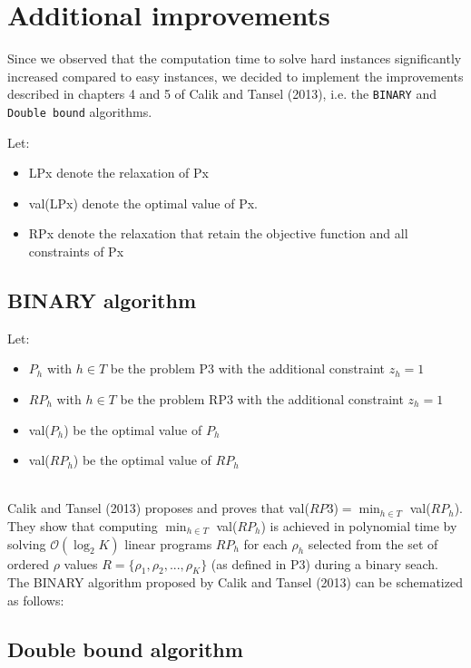 \chapter{Additional improvements}

Since we observed that the computation time to solve hard instances significantly increased compared to easy instances, we decided to implement the improvements described in chapters 4 and 5 of Calik and Tansel (2013), i.e. the \verb+BINARY+ and \verb+Double bound+ algorithms.

Let: 
\begin{itemize}
	\item LPx denote the relaxation of Px
	\item val(LPx) denote the optimal value of Px.
	\item RPx denote the relaxation that retain the objective function and all constraints of Px
\end{itemize} 

\section{BINARY algorithm}

Let:
\begin{itemize}
	\item $P_h$ with $h \in T$ be the problem P3 with the additional constraint $z_h = 1$
	\item $RP_h$ with $h \in T$ be the problem RP3 with the additional constraint $z_h = 1$
	\item val($P_h$) be the optimal value of $P_h$
	\item val($RP_h$) be the optimal value of $RP_h$
\end{itemize}\ \\

Calik and Tansel (2013) proposes and proves that val($RP3$)$ = \min_{h \in T}$ val($RP_h$). They show that computing $\min_{h \in T}$ val($RP_h$) is achieved in polynomial time by solving $\mathcal{O}\left( \log_2 K \right)$ linear programs $RP_h$ for each $\rho_h$ selected from the set of ordered $\rho$ values $R = \lbrace \rho_1, \rho_2, ..., \rho_K \rbrace$ (as defined in P3) during a binary seach.\\
The BINARY algorithm proposed by Calik and Tansel (2013) can be schematized as follows:


\section{Double bound algorithm}

